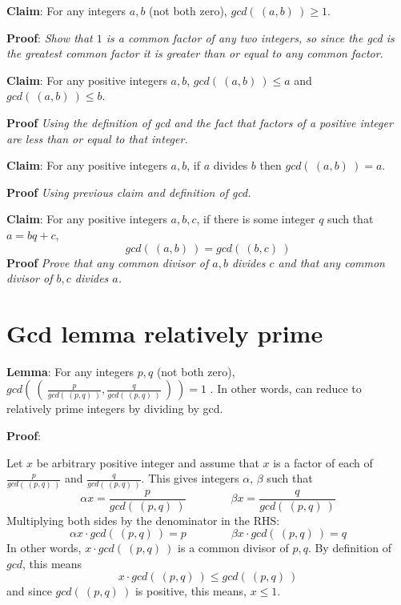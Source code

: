 \documentclass[12pt, oneside]{article}
\begin{document}
{\bf Claim}: For any integers $a,b$ (not both zero), $gcd(~(a,b)~) \geq 1$.

{\bf Proof}: {\it Show that $1$ is a common factor of any two integers, so since the gcd 
is the greatest common factor it is greater than or equal to any common factor.}

\vspace{150pt}

{\bf Claim}: For any positive integers $a,b$, $gcd(~(a,b)~) \leq a$ and $gcd( ~(a,b)~) \leq b$.

{\bf Proof} {\it Using the definition of gcd and the fact that factors of a positive integer
are less than or equal to that integer.}

\vspace{150pt}

{\bf Claim}: For any positive integers $a,b$, if $a$ divides $b$ then $gcd(~(a,b)~) = a$.

{\bf Proof} {\it Using previous claim and definition of gcd.}

\vspace{150pt}


{\bf Claim}: For any positive integers $a,b,c$, if there is some integer $q$ such that $a = bq + c$,
\[
    gcd(~(a,b)~) = gcd (~(b,c)~)
\]
{\bf Proof} {\it Prove that any common divisor of $a,b$ divides $c$ and that any common 
divisor of $b,c$ divides $a$.}

\vspace{150pt}
 \vfill
\section*{Gcd lemma relatively prime}


{\bf Lemma}: For any integers $p, q$ (not both zero), 
$gcd \left(~ \left(~\frac{p}{gcd(~(p,q)~)}, \frac{q}{gcd(~(p,q)~)} ~\right) ~\right) = 1$ .
In other words, can reduce to relatively prime integers by dividing by gcd.

{\bf Proof}:

Let $x$ be arbitrary positive integer and assume that $x$ is a 
factor of each of $\frac{p}{gcd(~(p,q)~)}$ and $\frac{q}{gcd(~(p,q)~)}$. 
This gives integers $\alpha$, $\beta$ such that 
\[
    \alpha x = \frac{p}{gcd(~(p,q)~)} \qquad \qquad \beta x = \frac{q}{gcd(~(p,q)~)}
\]
Multiplying both sides by the denominator in the RHS: 
\[
    \alpha x \cdot gcd(~(p,q)~)= p \qquad \qquad \beta x \cdot gcd(~(p,q)~)= q
\]
In other words, $x \cdot gcd(~(p,q)~)$ is a common divisor of $p, q$. By definition of $gcd$, this means
\[
    x \cdot gcd (~(p,q)~) \leq gcd (~(p,q)~)
\]
and since $gcd(~(p,q)~)$ is positive, this means, $x \leq 1$.
\vspace{350pt}
 \vfill
\end{document}
